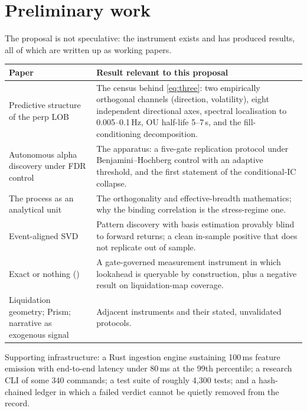 \documentclass[11pt,a4paper]{article}
\newcommand{\code}[1]{\texttt{\detokenize{#1}}}
\begin{document}
\section{Preliminary work}

The proposal is not speculative: the instrument exists and has produced results, all of which are
written up as working papers.

\begin{center}
\small
\begin{tabular}{@{}p{} p{}@{}}
\hline\hline
\textbf{Paper} & \textbf{Result relevant to this proposal} \\
\hline
Predictive structure of the perp LOB &
  The census behind \eqref{eq:three}: two empirically orthogonal channels (direction, volatility),
  eight independent directional axes, spectral localisation to 0.005--0.1\,Hz, OU half-life
  5--7\,s, and the fill-conditioning decomposition. \\
Autonomous alpha discovery under FDR control &
  The apparatus: a five-gate replication protocol under Benjamini--Hochberg control with an adaptive
  threshold, and the first statement of the conditional-IC collapse. \\
The process as an analytical unit &
  The orthogonality and effective-breadth mathematics; why the binding correlation is the
  stress-regime one. \\
Event-aligned SVD &
  Pattern discovery with basis estimation provably blind to forward returns; a clean in-sample
  positive that does not replicate out of sample. \\
Exact or nothing (\code{nat2}) &
  A gate-governed measurement instrument in which lookahead is queryable by construction, plus a
  negative result on liquidation-map coverage. \\
Liquidation geometry; Prism; narrative as exogenous signal &
  Adjacent instruments and their stated, unvalidated protocols. \\
\hline\hline
\end{tabular}
\end{center}

Supporting infrastructure: a Rust ingestion engine sustaining 100\,ms feature emission with
end-to-end latency under 80\,ms at the 99th percentile; a research CLI of some 340 commands; a test
suite of roughly 4{,}300 tests; and a hash-chained ledger in which a failed verdict cannot be quietly
removed from the record.
\end{document}
